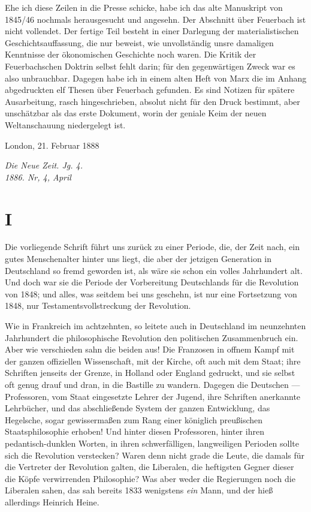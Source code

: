 Ehe ich diese Zeilen in die Presse schicke, habe ich das alte
Manuskript von 1845/46 nochmals herausgesucht und angesehn. Der
Abschnitt über Feuerbach ist nicht vollendet. Der fertige Teil besteht
in einer Darlegung der materialistischen Geschichtsauffassung, die nur
beweist, wie unvollständig unsre damaligen Kenntnisse der ökonomischen
Geschichte noch waren. Die Kritik der Feuerbachschen Doktrin selbst
fehlt darin; für den gegenwärtigen Zweck war es also unbrauchbar.
Dagegen habe ich in einem alten Heft von Marx die im Anhang
abgedruckten elf Thesen über Feuerbach gefunden. Es sind Notizen für
spätere Ausarbeitung, rasch hingeschrieben, absolut nicht für den Druck
bestimmt, aber unschätzbar als das erste Dokument, worin der geniale
Keim der neuen Weltanschauung niedergelegt ist.

\bigskip

\hfill{}London, 21. Februar 1888 

\quebra

\begin{flushright}
\emph{Die Neue Zeit. Jg. 4.}\\
\emph{1886. Nr, 4, April}
\end{flushright}

\vspace{2cm}

\section{I}

\noindent{}Die vorliegende
Schrift führt uns zurück zu einer
Periode, die, der Zeit nach, ein gutes Menschenalter hinter uns liegt,
die aber der jetzigen Generation in Deutschland so fremd geworden ist,
als wäre sie schon ein volles Jahrhundert alt. Und doch war sie die
Periode der Vorbereitung Deutschlands für die Revolution von 1848; und
alles, was seitdem bei uns geschehn, ist nur eine Fortsetzung von 1848,
nur Testamentsvollstreckung der Revolution.

Wie in Frankreich im achtzehnten, so leitete auch in Deutschland
im neunzehnten Jahrhundert die philosophische Revolution den politischen
Zusammenbruch ein. Aber wie verschieden sahn die beiden aus! Die
Franzosen in offnem Kampf mit der ganzen offiziellen Wissenschaft, mit
der Kirche, oft auch mit dem Staat; ihre Schriften jenseits der Grenze,
in Holland oder England gedruckt, und sie selbst oft genug drauf und
dran, in die Bastille zu wandern. Dagegen die Deutschen --- Professoren,
vom Staat eingesetzte Lehrer der Jugend, ihre Schriften anerkannte
Lehrbücher, und das abschließende System der ganzen Entwicklung, das
Hegelsche, sogar gewissermaßen zum Rang einer königlich preußischen
Staatsphilosophie erhoben! Und hinter diesen Professoren, hinter ihren
pedantisch-dunklen Worten, in ihren schwerfälligen, langweiligen
Perioden sollte sich die Revolution verstecken? Waren denn nicht grade
die Leute, die damals für die Vertreter der Revolution galten, die
Liberalen, die heftigsten Gegner dieser die Köpfe verwirrenden
Philosophie? Was aber weder die Regierungen noch die Liberalen sahen,
das sah bereits 1833 wenigstens \emph{ein} Mann, und der hieß allerdings
Heinrich Heine.



